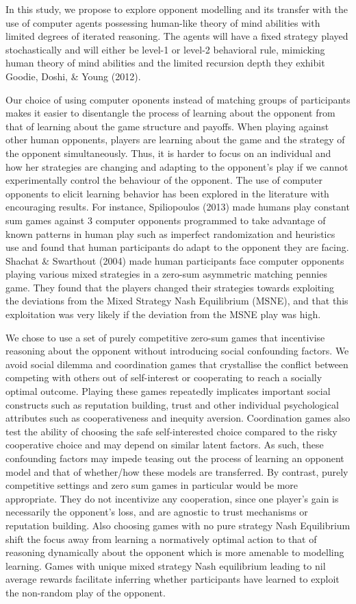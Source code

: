 \documentclass[man,floatsintext]{apa6}
\begin{document}
In this study, we propose to explore opponent modelling and its transfer with the use of computer agents possessing human-like theory of mind abilities with limited degrees of iterated reasoning. The agents will have a fixed strategy played stochastically and will either be level-1 or level-2 behavioral rule, mimicking human theory of mind abilities and the limited recursion depth they exhibit Goodie, Doshi, \& Young (2012).

Our choice of using computer oponents instead of matching groups of participants makes it easier to disentangle the process of learning about the opponent from that of learning about the game structure and payoffs. When playing against other human opponents, players are learning about the game and the strategy of the opponent simultaneously. Thus, it is harder to focus on an individual and how her strategies are changing and adapting to the opponent's play if we cannot experimentally control the behaviour of the opponent. The use of computer opponents to elicit learning behavior has been explored in the literature with encouraging results. For instance, Spiliopoulos (2013) made humans play constant sum games against 3 computer opponents programmed to take advantage of known patterns in human play such as imperfect randomization and heuristics use and found that human participants do adapt to the opponent they are facing. Shachat \& Swarthout (2004) made human participants face computer opponents playing various mixed strategies in a zero-sum asymmetric matching pennies game. They found that the players changed their strategies towards exploiting the deviations from the Mixed Strategy Nash Equilibrium (MSNE), and that this exploitation was very likely if the deviation from the MSNE play was high.

We chose to use a set of purely competitive zero-sum games that incentivise reasoning about the opponent without introducing social confounding factors. We avoid social dilemma and coordination games that crystallise the conflict between competing with others out of self-interest or cooperating to reach a socially optimal outcome. Playing these games repeatedly implicates important social constructs such as reputation building, trust and other individual psychological attributes such as cooperativeness and inequity aversion. Coordination games also test the ability of choosing the safe self-interested choice compared to the risky cooperative choice and may depend on similar latent factors. As such, these confounding factors may impede teasing out the process of learning an opponent model and that of whether/how these models are transferred. By contrast, purely competitive settings and zero sum games in particular would be more appropriate. They do not incentivize any cooperation, since one player's gain is necessarily the opponent's loss, and are agnostic to trust mechanisms or reputation building. Also choosing games with no pure strategy Nash Equilibrium shift the focus away from learning a normatively optimal action to that of reasoning dynamically about the opponent which is more amenable to modelling learning. Games with unique mixed strategy Nash equilibrium leading to nil average rewards facilitate inferring whether participants have learned to exploit the non-random play of the opponent.
\end{document}
